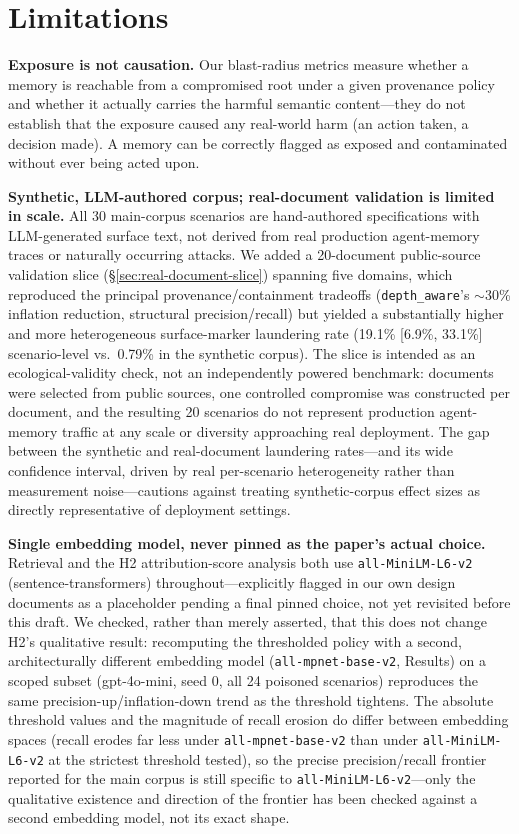 \section{Limitations}

\textbf{Exposure is not causation.} Our blast-radius metrics measure
whether a memory is reachable from a compromised root under a given
provenance policy and whether it actually carries the harmful semantic
content---they do not establish that the exposure caused any real-world
harm (an action taken, a decision made). A memory can be correctly
flagged as exposed and contaminated without ever being acted upon.

\textbf{Synthetic, LLM-authored corpus; real-document validation is
limited in scale.} All 30 main-corpus scenarios are hand-authored
specifications with LLM-generated surface text, not derived from real
production agent-memory traces or naturally occurring attacks. We added
a 20-document public-source validation slice
(\S\ref{sec:real-document-slice}) spanning five domains, which
reproduced the principal provenance/containment tradeoffs
(\texttt{depth\_aware}'s $\sim$30\% inflation reduction, structural
precision/recall) but yielded a substantially higher and more
heterogeneous surface-marker laundering rate (19.1\% [6.9\%, 33.1\%]
scenario-level vs.\ 0.79\% in the synthetic corpus). The slice is
intended as an ecological-validity check, not an independently powered
benchmark: documents were selected from public sources, one controlled
compromise was constructed per document, and the resulting 20 scenarios
do not represent production agent-memory traffic at any scale or
diversity approaching real deployment. The gap between the synthetic
and real-document laundering rates---and its wide confidence interval,
driven by real per-scenario heterogeneity rather than measurement
noise---cautions against treating synthetic-corpus effect sizes as
directly representative of deployment settings.

\textbf{Single embedding model, never pinned as the paper's actual
choice.} Retrieval and the H2 attribution-score analysis both use
\texttt{all-MiniLM-L6-v2} (sentence-transformers) throughout---explicitly
flagged in our own design documents as a placeholder pending a final
pinned choice, not yet revisited before this draft. We checked, rather
than merely asserted, that this does not change H2's qualitative
result: recomputing the thresholded policy with a second,
architecturally different embedding model (\texttt{all-mpnet-base-v2},
Results) on a scoped subset (gpt-4o-mini, seed 0, all 24 poisoned
scenarios) reproduces the same precision-up/inflation-down trend as
the threshold tightens. The absolute threshold values and the
magnitude of recall erosion do differ between embedding spaces (recall
erodes far less under \texttt{all-mpnet-base-v2} than under
\texttt{all-MiniLM-L6-v2} at the strictest threshold tested), so the
precise precision/recall frontier reported for the main corpus is
still specific to \texttt{all-MiniLM-L6-v2}---only the qualitative
existence and direction of the frontier has been checked against a
second embedding model, not its exact shape.

